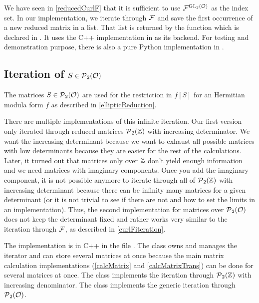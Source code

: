 We have seen in \cref{reducedCurlF} that it is sufficient to use ${\mathcal{F}}^{\operatorname{GL}_2(\mathcal{O})}$ as the index set. In our implementation, we iterate through $\mathcal{F}$ and save the first occurrence of a new reduced matrix in a list. That list is returned by the function  which is declared in . It uses the C++ implementation in  as its backend. For testing and demonstration purpose, there is also a pure Python implementation  in .


\subsection{Iteration of $S \in \operatorname{\mathcal{P}}_2(\mathcal{O})$}
\label{Siter}

The matrices $S \in \operatorname{\mathcal{P}}_2(\mathcal{O})$ are used for the restriction in $f[S]$ for an Hermitian modula form $f$ as described in \cref{ellipticReduction}.

There are multiple implementations of this infinite iteration. Our first version only iterated through reduced matrices $\operatorname{\mathcal{P}}_2(\mathbb{Z})$ with increasing determinator. We want the increasing determinant because we want to exhaust all possible matrices with low determinants because they are easier for the rest of the calculations. Later, it turned out that matrices only over $\mathbb{Z}$ don't yield enough information and we need matrices with imaginary components. Once you add the imaginary component, it is not possible anymore to iterate through all of $\operatorname{\mathcal{P}}_2(\mathbb{Z})$ with increasing determinant because there can be infinity many matrices for a given determinant (or it is not trivial to see if there are not and how to set the limits in an implementation). Thus, the second implementation for matrices over $\operatorname{\mathcal{P}}_2(\mathcal{O})$ does not keep the determinant fixed and rather works very similar to the iteration through $\mathcal{F}$, as described in \cref{curlFiteration}.

The implementation is in C++ in the file . The class  owns and manages the iterator and can store several matrices at once because the main matrix calculation implementations (\cref{calcMatrix} and \cref{calcMatrixTrans}) can be done for several matrices at once. The class  implements the iteration through $\operatorname{\mathcal{P}}_2(\mathbb{Z})$ with increasing denominator. The class  implements the generic iteration through $\operatorname{\mathcal{P}}_2(\mathcal{O})$.

